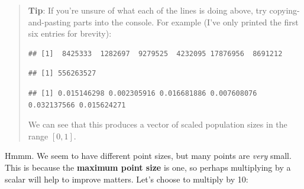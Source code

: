 \documentclass[]{book}
\newenvironment{Shaded}{\begin{snugshade}}{\end{snugshade}}
\newcommand{\KeywordTok}[1]{\textcolor[rgb]{0.13,0.29,0.53}{\textbf{{#1}}}}
\newcommand{\DataTypeTok}[1]{\textcolor[rgb]{0.13,0.29,0.53}{{#1}}}
\newcommand{\DecValTok}[1]{\textcolor[rgb]{0.00,0.00,0.81}{{#1}}}
\newcommand{\StringTok}[1]{\textcolor[rgb]{0.31,0.60,0.02}{{#1}}}
\newcommand{\NormalTok}[1]{{#1}}
\theoremstyle{definition}
\theoremstyle{definition}
\theoremstyle{definition}
\theoremstyle{remark}
\begin{document}
\begin{quote}
\textbf{Tip}: If you're unsure of what each of the lines is doing above,
try copying-and-pasting parts into the console. For example (I've only
printed the first six entries for brevity):

\begin{Shaded}
\end{Shaded}

\begin{verbatim}
## [1]  8425333  1282697  9279525  4232095 17876956  8691212
\end{verbatim}

\begin{Shaded}
\end{Shaded}

\begin{verbatim}
## [1] 556263527
\end{verbatim}

\begin{Shaded}
\end{Shaded}

\begin{verbatim}
## [1] 0.015146298 0.002305916 0.016681886 0.007608076 0.032137566 0.015624271
\end{verbatim}

We can see that this produces a vector of scaled population sizes in the
range \([0, 1]\).
\end{quote}

Hmmm. We seem to have different point sizes, but many points are
\emph{very} small. This is because the \textbf{maximum point size} is
one, so perhaps multiplying by a scalar will help to improve matters.
Let's choose to multiply by 10:

\begin{Shaded}
\end{Shaded}
\end{document}
